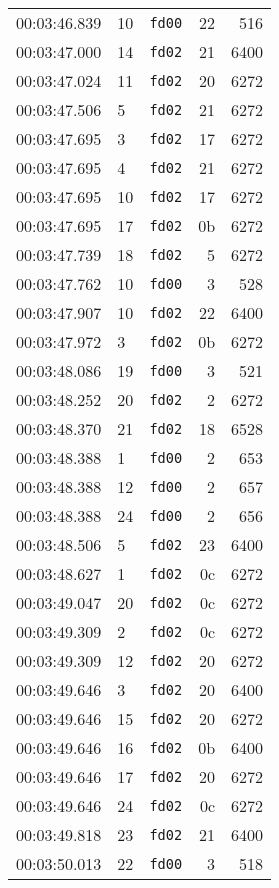 \documentclass{article}
\begin{document}
\begin{longtable}{lllrr}
00:03:46.839 & 10 & \texttt{fd00} & 22 & 516 \\
00:03:47.000 & 14 & \texttt{fd02} & 21 & 6400 \\
00:03:47.024 & 11 & \texttt{fd02} & 20 & 6272 \\
00:03:47.506 & 5 & \texttt{fd02} & 21 & 6272 \\
00:03:47.695 & 3 & \texttt{fd02} & 17 & 6272 \\
00:03:47.695 & 4 & \texttt{fd02} & 21 & 6272 \\
00:03:47.695 & 10 & \texttt{fd02} & 17 & 6272 \\
00:03:47.695 & 17 & \texttt{fd02} & 0b & 6272 \\
00:03:47.739 & 18 & \texttt{fd02} & 5 & 6272 \\
00:03:47.762 & 10 & \texttt{fd00} & 3 & 528 \\
00:03:47.907 & 10 & \texttt{fd02} & 22 & 6400 \\
00:03:47.972 & 3 & \texttt{fd02} & 0b & 6272 \\
00:03:48.086 & 19 & \texttt{fd00} & 3 & 521 \\
00:03:48.252 & 20 & \texttt{fd02} & 2 & 6272 \\
00:03:48.370 & 21 & \texttt{fd02} & 18 & 6528 \\
00:03:48.388 & 1 & \texttt{fd00} & 2 & 653 \\
00:03:48.388 & 12 & \texttt{fd00} & 2 & 657 \\
00:03:48.388 & 24 & \texttt{fd00} & 2 & 656 \\
00:03:48.506 & 5 & \texttt{fd02} & 23 & 6400 \\
00:03:48.627 & 1 & \texttt{fd02} & 0c & 6272 \\
00:03:49.047 & 20 & \texttt{fd02} & 0c & 6272 \\
00:03:49.309 & 2 & \texttt{fd02} & 0c & 6272 \\
00:03:49.309 & 12 & \texttt{fd02} & 20 & 6272 \\
00:03:49.646 & 3 & \texttt{fd02} & 20 & 6400 \\
00:03:49.646 & 15 & \texttt{fd02} & 20 & 6272 \\
00:03:49.646 & 16 & \texttt{fd02} & 0b & 6400 \\
00:03:49.646 & 17 & \texttt{fd02} & 20 & 6272 \\
00:03:49.646 & 24 & \texttt{fd02} & 0c & 6272 \\
00:03:49.818 & 23 & \texttt{fd02} & 21 & 6400 \\
00:03:50.013 & 22 & \texttt{fd00} & 3 & 518 \\

\end{longtable}
\end{document}
